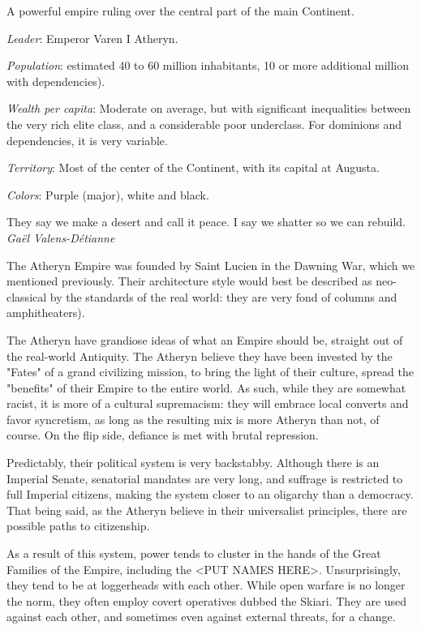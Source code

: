 A powerful empire ruling over the central part of the main Continent.


\textit{Leader}: Emperor Varen I Atheryn.

\textit{Population}: estimated 40 to 60 million inhabitants, 10 or more additional million with dependencies).

\textit{Wealth per capita}: Moderate on average, but with significant inequalities between the very rich elite class, and a considerable poor underclass. For dominions and dependencies, it is very variable.

\textit{Territory}: Most of the center of the Continent, with its capital at Augusta.
    
\textit{Colors}: Purple (major), white and black.


\begin{rpg-quotebox}
They say we make a desert and call it peace. I say we shatter so we can rebuild. \\ \textendash \textit{Gaël Valens-Détianne}
\end{rpg-quotebox}

The Atheryn Empire was founded by Saint Lucien in the Dawning War, which we mentioned previously. Their architecture style would best be described as neo-classical by the standards of the real world: they are very fond of columns and amphitheaters).

The Atheryn have grandiose ideas of what an Empire should be, straight out of the real-world Antiquity. The Atheryn believe they have been invested by the "Fates" of a grand civilizing mission, to bring the light of their culture, spread the "benefits" of their Empire to the entire world. As such, while they are somewhat racist, it is more of a cultural supremacism: they will embrace local converts and favor syncretism, as long as the resulting mix is more Atheryn than not, of course. On the flip side, defiance is met with brutal repression. 

Predictably, their political system is very backstabby. Although there is an Imperial Senate, senatorial mandates are very long, and suffrage is restricted to full Imperial citizens, making the system closer to an oligarchy than a democracy. That being said, as the Atheryn believe in their universalist principles, there are possible paths to citizenship.

As a result of this system, power tends to cluster in the hands of the Great Families of the Empire, including the <PUT NAMES HERE>. Unsurprisingly, they tend to be at loggerheads with each other. While open warfare is no longer the norm, they often employ covert operatives dubbed the Skiari. They are used against each other, and sometimes even against external threats, for a change.

